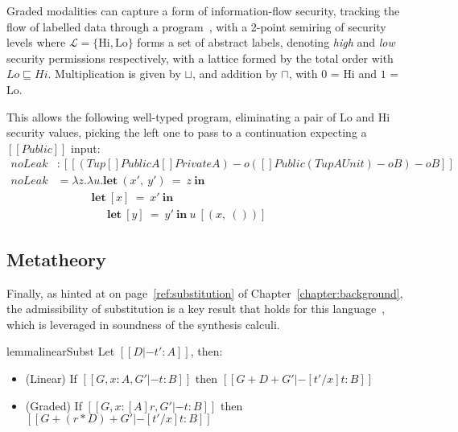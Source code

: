 \begin{example}%
\label{exm:security}
%
Graded modalities can capture a form of information-flow security, tracking the
flow of labelled data through a
program~\citep{DBLP:journals/pacmpl/OrchardLE19}, with a 2-point semiring of
security levels where $\mathcal{L} = \{ \text{Hi}, \text{Lo} \}$ forms a set of
abstract labels, denoting \emph{high} and \emph{low} security permissions
respectively, with a lattice formed by the total order with $Lo \sqsubseteq Hi$.
Multiplication is given by $\sqcup$, and addition by $\sqcap$, with $0$ = $\text{Hi}$
and $1$ = $\text{Lo}$. 

This allows the following well-typed program, eliminating a pair of $\text{Lo}$
and $\text{Hi}$ security values, picking the left one to pass to a continuation
expecting a $[[ Public ]]$ input:
%
\begin{align*}
\textit{noLeak} & : [[ (Tup {[] Public A} {[] Private A}) -o {({[]
                  Public (Tup A Unit)} -o B) -o B} ]] \\
\textit{noLeak} & = \lambda z . \lambda u . \textbf{let}\ (x',\ y')\ =\ z\ \textbf{in}\ \\
                & \;\;\;\;\;\;\;\;\;\;\; \textbf{let}\ [x]\ =\ x'\ \textbf{in}\ \\ 
                & \;\;\;\;\;\;\;\;\;\;\;\;\;\;\;\; \textbf{let}\ [y]\ =\ y'\ \textbf{in}\ u\ [(x,\ ())]
\end{align*}
\end{example}

\subsection{Metatheory}
Finally, as hinted at on page~\ref{ref:substitution} of
Chapter~\ref{chapter:background}, the admissibility of substitution is a key
result that holds for this language~\citep{DBLP:journals/pacmpl/OrchardLE19},
which is leveraged in soundness of the synthesis calculi.
%
\begin{restatable}{lemma}{linearSubst}
Let $[[ D |- t' : A]]$, then:
\label{lemma:substitution}
\begin{itemize}[leftmargin=1em]
\item (Linear) \hspace{0.04em} If $[[ {G, x : A}
    , { G' } |- t : B]]$ then $[[ G + D + G' |-
[ t' / x ] t : B ]]$
\item (Graded) If $[[ {G, x : [A] r} , { G' } |- t : B]]$
then $[[ G + (r * D) + G' |- [ t' / x ] t : B ]]$
\end{itemize}
\end{restatable}


